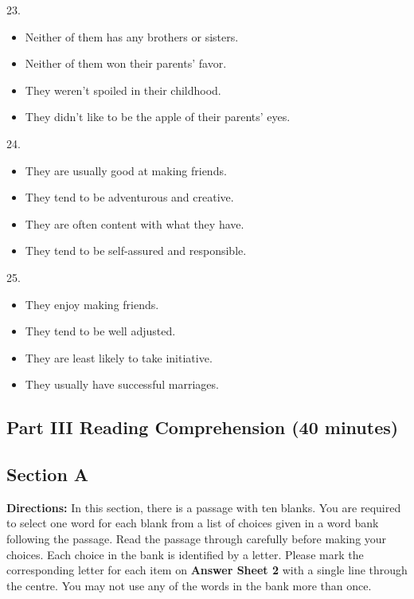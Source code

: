 \documentclass[UTF8,11pt]{ctexart}
\begin{document}
23.


\begin{itemize}[leftmargin=2em,itemsep=.2em,topsep=.4em]\item[A.] Neither of them has any brothers or sisters.
\item[B.] Neither of them won their parents’ favor.
\item[C.] They weren’t spoiled in their childhood.
\item[D.] They didn’t like to be the apple of their parents’ eyes.
\end{itemize}

24.


\begin{itemize}[leftmargin=2em,itemsep=.2em,topsep=.4em]\item[A.] They are usually good at making friends.
\item[B.] They tend to be adventurous and creative.
\item[C.] They are often content with what they have.
\item[D.] They tend to be self-assured and responsible.
\end{itemize}

25.


\begin{itemize}[leftmargin=2em,itemsep=.2em,topsep=.4em]\item[A.] They enjoy making friends.
\item[B.] They tend to be well adjusted.
\item[C.] They are least likely to take initiative.
\item[D.] They usually have successful marriages.
\end{itemize}

\subsection*{\textbf{Part III} \textbf{Reading Comprehension} \textbf{(40 minutes)}}


\subsection*{\textbf{Section A}}


\textbf{Directions:} In this section, there is a passage with ten blanks. You are required to select one word for each blank from a list of choices given in a word bank following the passage. Read the passage through carefully before making your choices. Each choice in the bank is identified by a letter. Please mark the corresponding letter for each item on\textbf{ Answer Sheet 2} with a single line through the centre. You may not use any of the words in the bank more than once.
\end{document}
